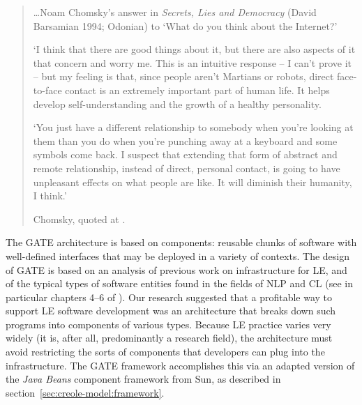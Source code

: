 %
%
%
%



\ifprintedbook
\else
\begin{quote}
\ldots Noam Chomsky's answer in {\em Secrets, Lies and Democracy}
(David Barsamian 1994; Odonian) to `What do you think about the Internet?'

`I think that there are good things about it, but there are also
aspects of it that concern and worry me. This is an intuitive
response -- I can't prove it -- but my feeling is that, since people
aren't Martians or robots, direct face-to-face contact is an
extremely important part of human life. It helps develop self-understanding
and the growth of a healthy personality.

`You just have a different relationship to somebody when
you're looking at them than you do when you're punching away at a
keyboard and some symbols come back. I suspect that
extending that form of abstract and remote relationship, instead of
direct, personal contact, is going to have unpleasant
effects on what people are like. It will diminish their humanity, I think.'

Chomsky, quoted at .
\end{quote}
\fi

The GATE architecture is based on components: reusable chunks of software
with well-defined interfaces that may be deployed in a variety of contexts.
The design of GATE is based on an analysis of previous work on
infrastructure for LE, and of the typical types of software entities
found in the fields of NLP and CL (see in particular chapters 4--6
of \cite{Cun00a}). Our research suggested that a profitable way
to support LE software development was an architecture that
breaks down such programs into components of various types.
Because LE practice varies very widely (it is, after all, predominantly
a research field), the architecture must avoid restricting the sorts
of components that developers can plug into the infrastructure.
The GATE framework accomplishes this via an adapted
version of the {\em Java Beans} component framework from Sun, as described in
section~\ref{sec:creole-model:framework}.

